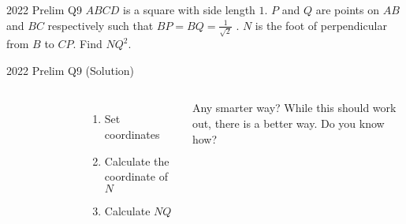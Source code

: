 \documentclass{beamer}
\begin{document}
\begin{frame}{2022 Prelim Q9}
	$ABCD$ is a square with side length $1$. $P$ and $Q$ are points on $AB$ and $BC$ respectively such that $BP = BQ = \frac{1}{\sqrt{2} }$	.  $N$ is the foot of perpendicular from $B$ to $CP$. Find $NQ^2$.
\end{frame}

\begin{frame}{2022 Prelim Q9 (Solution)}
	\begin{columns}
			\begin{figure}[H]
			\end{figure}	
		\begin{enumerate}
			\item<1-> Set coordinates
			\item<2-> Calculate the coordinate of $N$
			\item<3-> Calculate $NQ$
		\end{enumerate}
		\begin{block}{Any smarter way?}
			While this should work out, there is a better way. Do you know how?
		\end{block}
	\end{columns}
\end{frame}
\end{document}
